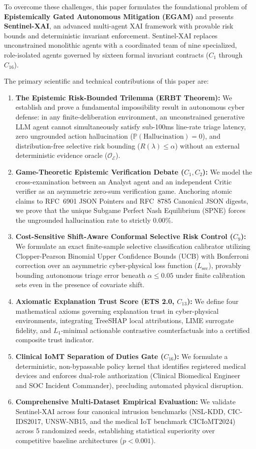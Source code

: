 \documentclass{ieeeaccess}
\begin{document}
To overcome these challenges, this paper formulates the foundational problem of \textbf{Epistemically Gated Autonomous Mitigation (EGAM)} and presents \textbf{Sentinel-XAI}, an advanced multi-agent XAI framework with provable risk bounds and deterministic invariant enforcement. Sentinel-XAI replaces unconstrained monolithic agents with a coordinated team of nine specialized, role-isolated agents governed by sixteen formal invariant contracts ($C_1$ through $C_{16}$). 

The primary scientific and technical contributions of this paper are:
\begin{enumerate}
    \item \textbf{The Epistemic Risk-Bounded Trilemma (ERBT Theorem):} We establish and prove a fundamental impossibility result in autonomous cyber defense: in any finite-deliberation environment, an unconstrained generative LLM agent cannot simultaneously satisfy sub-100ms line-rate triage latency, zero ungrounded action hallucination ($\mathbb{P}(\text{Hallucination}) = 0$), and distribution-free selective risk bounding ($R(\lambda) \le \alpha$) without an external deterministic evidence oracle ($\mathcal{O}_{\mathcal{E}}$).
    \item \textbf{Game-Theoretic Epistemic Verification Debate ($C_1, C_2$):} We model the cross-examination between an Analyst agent and an independent Critic verifier as an asymmetric zero-sum verification game. Anchoring atomic claims to RFC~6901 JSON Pointers and RFC~8785 Canonical JSON digests, we prove that the unique Subgame Perfect Nash Equilibrium (SPNE) forces the ungrounded hallucination rate to strictly 0.00\%.
    \item \textbf{Cost-Sensitive Shift-Aware Conformal Selective Risk Control ($C_9$):} We formulate an exact finite-sample selective classification calibrator utilizing Clopper-Pearson Binomial Upper Confidence Bounds (UCB) with Bonferroni correction over an asymmetric cyber-physical loss function ($L_{\text{sec}}$), provably bounding autonomous triage error beneath $\alpha \le 0.05$ under finite calibration sets even in the presence of covariate shift.
    \item \textbf{Axiomatic Explanation Trust Score (ETS 2.0, $C_{13}$):} We define four mathematical axioms governing explanation trust in cyber-physical environments, integrating TreeSHAP local attributions, LIME surrogate fidelity, and $L_1$-minimal actionable contrastive counterfactuals into a certified composite trust indicator.
    \item \textbf{Clinical IoMT Separation of Duties Gate ($C_{16}$):} We formulate a deterministic, non-bypassable policy kernel that identifies registered medical devices and enforces dual-role authorization (Clinical Biomedical Engineer and SOC Incident Commander), precluding automated physical disruption.
    \item \textbf{Comprehensive Multi-Dataset Empirical Evaluation:} We validate Sentinel-XAI across four canonical intrusion benchmarks (NSL-KDD, CIC-IDS2017, UNSW-NB15, and the medical IoT benchmark CICIoMT2024) across 5 randomized seeds, establishing statistical superiority over competitive baseline architectures ($p < 0.001$).
\end{enumerate}
\end{document}
